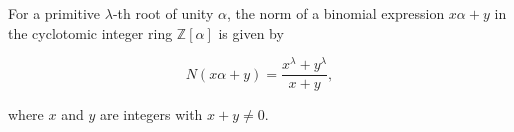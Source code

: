 For a primitive $\lambda$-th root of unity $\alpha$, the norm of a binomial expression $x\alpha + y$ in the cyclotomic integer ring $\mathbb{Z}[\alpha]$ is given by

$$
N(x\alpha + y) = \frac{x^\lambda + y^\lambda}{x + y},
$$

where $x$ and $y$ are integers with $x + y \neq 0$.
